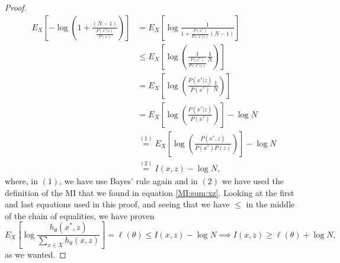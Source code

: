 \begin{proof}
\begin{align*}
E_X\left[ -\log\left( 1+ \frac{ (N-1)}{\frac{P(x^*|z)} {P(x)}} \right)\right] &  =
E_X\left[ \log \frac{1}{ 1+ \frac{P(x^*)}{P(x^*|z)}(N-1)}\right] \\
& \leq E_X\left[ \log\left(\frac{1}{\frac{P(x^*)}{P(x^*|z)}}\frac{1}{N}\right)\right]\\
& = E_X\left[ \log\left(\frac{P(x^*|z)}{P(x^*)} \frac{1}{N}\right)\right]\\
& = E_X \left[ \log\left(\frac{P(x^*|z)}{P(x^*)}\right)\right] - \log N \\
& \stackrel{(1)}{=} E_X \left[ \log\left(\frac{P(x^*,z)}{P(x^*)P(z)}\right)\right] - \log N\\
& \stackrel{(2)}{=} I(x,z) - \log N,
\end{align*}
where, in $(1)$, we have use Bayes' rule again and in $(2)$ we have used the definition of the MI that we found in equation \ref{MI:sum:xz}. Looking at the first and last equations used in this proof, and seeing that we have $\leq$ in the middle of the chain of equalities, we have proven
\[
    E_X \left[ \log \frac{h_\theta(x^*,z)}{\sum_{x \in X}h_\theta(x,z)}\right] = \ell (\theta) \leq I(x,z) - \log N \implies I(x,z) \geq \ell(\theta)+ \log N,
\]
as we wanted.   
\end{proof}

